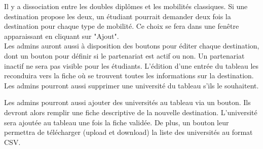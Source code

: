  Il y a dissociation entre les doubles diplômes et les mobilités classiques. Si une destination propose les deux, un étudiant pourrait demander deux fois la destination pour chaque type de mobilité. Ce choix se fera dans une fenêtre apparaissant en cliquant sur "Ajout". \\
 
 Les admins auront aussi à disposition des boutons pour éditer chaque destination, dont un bouton pour définir si le partenariat est actif ou non. Un partenariat inactif ne sera pas visible pour les étudiants.
 L'édition d'une entrée du tableau les reconduira vers la fiche où se trouvent toutes les informations sur la destination.
 Les admins pourront aussi supprimer une université du tableau s'ils le souhaitent.
 
 Les admins pourront aussi ajouter des universités au tableau via un bouton. Ils devront alors remplir une fiche descriptive de la nouvelle destination. L'université sera ajoutée au tableau une fois la fiche validée. De plus, un bouton leur permettra de télécharger (upload et download) la liste des universités au format CSV.
 
